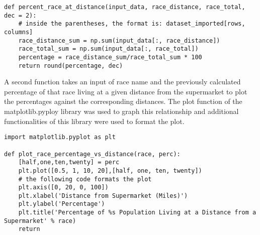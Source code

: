 \documentclass[letterpaper]{article}
\begin{document}
\lstset{language=Python}
\begin{lstlisting}[frame=single] 
def percent_race_at_distance(input_data, race_distance, race_total, dec = 2):
    # inside the parentheses, the format is: dataset_imported[rows, columns]
    race_distance_sum = np.sum(input_data[:, race_distance])
    race_total_sum = np.sum(input_data[:, race_total])
    percentage = race_distance_sum/race_total_sum * 100
    return round(percentage, dec)

\end{lstlisting}

A second function takes an input of race name and the previously calculated percentage of that race living at a given distance from the supermarket to plot the percentages against the corresponding distances. The plot function of the matplotlib.pyploy library was used to graph this relationship and additional functionalities of this library were used to format the plot.
\vspace{0.25cm}

\lstset{language=Python}
\begin{lstlisting}[frame=single]
import matplotlib.pyplot as plt

def plot_race_percentage_vs_distance(race, perc):
    [half,one,ten,twenty] = perc
    plt.plot([0.5, 1, 10, 20],[half, one, ten, twenty])
    # the following code formats the plot
    plt.axis([0, 20, 0, 100])
    plt.xlabel('Distance from Supermarket (Miles)')
    plt.ylabel('Percentage')
    plt.title('Percentage of %s Population Living at a Distance from a Supermarket' % race)
    return

\end{lstlisting}
\end{document}

